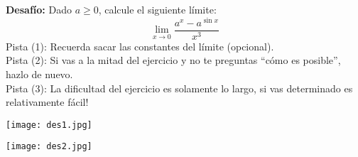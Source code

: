 \question[20]
\textbf{Desafío:} Dado $a\geq{0}$, calcule el siguiente límite:
$$\lim_{x \to 0} \frac{a^x-a^{\sin{x}}}{x^3}$$
Pista (1): Recuerda sacar las constantes del límite (opcional).\\
Pista (2): Si vas a la mitad del ejercicio y no te preguntas “cómo es posible”, hazlo de nuevo.\\
Pista (3): La dificultad del ejercicio es solamente lo largo, si vas determinado es relativamente fácil!
\mostrarpuntaje

\begin{solution}
    \begin{center}
        \texttt{[image: des1.jpg]}
    \end{center}
    \begin{center}
        \texttt{[image: des2.jpg]}
    \end{center}
\end{solution}

